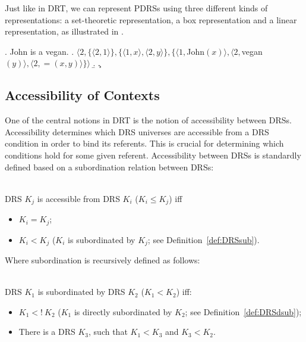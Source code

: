 Just like in DRT, we can represent PDRSs using three different kinds of
representations: a set-theoretic representation, a box representation
and a linear representation, as illustrated in \Next.

\ex. John is a vegan.
\a. $\langle 2, \{\langle 2,1\rangle\}, \{\langle 1, x\rangle, 
      \langle 2, y\rangle\},\{\langle1, $John$(x)\rangle,\langle2, 
      $vegan$(y)\rangle, \langle 2, =(x,y)\rangle\}\rangle$
\b. 
\c. 


\subsection{Accessibility of Contexts}

One of the central notions in DRT is the notion of accessibility between
DRSs. Accessibility determines which DRS universes are accessible from a DRS
condition in order to bind its referents. This is crucial for determining
which conditions hold for some given referent.  Accessibility between DRSs
is standardly defined based on a subordination relation between DRSs: 

\begin{definition}~\\
DRS $K_j$ is accessible from DRS $K_i$ ($K_i \leq K_j$) iff
  \begin{itemize}
    \item $K_i = K_j$;
    \item $K_i < K_j$ ($K_i$ is subordinated by $K_j$; see Definition~\ref{def:DRSsub}).
  \end{itemize}
\end{definition}

\noindent Where subordination is recursively defined as follows:

\begin{subdefinition}\label{def:DRSsub}~\\
DRS $K_1$ is subordinated by DRS $K_2$ ($K_1 < K_2$) iff:
  \begin{itemize}
    \item $K_1 <!~K_2$ 
      ($K_1$ is directly subordinated by $K_2$; see Definition~\ref{def:DRSdsub});
    \item There is a DRS $K_3$, such that $K_1 < K_3$  and $K_3 < K_2$.
  \end{itemize}
\end{subdefinition}

